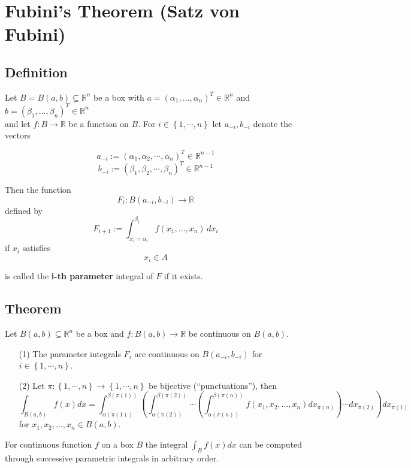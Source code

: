 \documentclass{article}
\begin{document}
\section{Fubini's Theorem (Satz von Fubini)}
\subsection*{Definition}
Let \( B = B(a,b) \subseteq \mathbb{R}^n \) be a box with \( a = (\alpha_1, \ldots,
\alpha_n)^T \in \mathbb{R}^n \) and \( b = (\beta_1, \ldots, \beta_n)^T \in \mathbb{R}^n \)
\\ and let \( f : B \to \mathbb{R} \) be a function on \( B \). For $i \in \left\{1,\cdots,n\right\}$
let \( a_{-i}, b_{-i} \) denote the vectors

\[ a_{-i} := (\alpha_1,\alpha_{2}, \cdots , \alpha_n)^T \in \mathbb{R}^{n-1} \] 
\[ b_{-i} := (\beta_1, \beta_2, \cdots , \beta_n)^T \in
\mathbb{R}^{n-1} \]

Then the function \[ F_i : B(a_{-i}, b_{-i}) \to \mathbb{R} \] defined by \[
F_{i+1} := \int_{x_i = \alpha_i}^{\beta_i} f(x_1, \dots, x_n) \, dx_i \] if \( x_i \) satisfies \[ x_i \in A
\]

is called the \textbf{i-th parameter} integral of \( F \) if it exists.
\subsection*{Theorem}
Let \( B(a,b) \subseteq \mathbb{R}^n \) be a box and \( f : B(a,b) \rightarrow \mathbb{R} \) be continuous on \( B(a,b) \).

\begin{enumerate}
    \item[(1)] The parameter integrals \( F_i \) are continuous on \( B(a_{-i}, b_{-i}) \) for \( i \in \left\{1, \cdots,n \right\} \).

    \item[(2)] Let \(\pi : \left\{1, \cdots,n\right\} \rightarrow \left\{1, \cdots, n\right\}\) be bijective (``punctuations''), then
    \[
    \int_{B(a,b)} f(x) dx = \int_{\alpha(\pi(1))}^{\beta(\pi(1))} \left( \int_{\alpha(\pi(2))}^{\beta(\pi(2))} \cdots \left( \int_{\alpha(\pi(n))}^{\beta(\pi(n))} f(x_1, x_2, \ldots, x_n) dx_{\pi(n)} \right) \cdots dx_{\pi(2)} \right) dx_{\pi(1)}
    \]
    for \( x_1, x_2, \ldots, x_n \in B(a,b) \).
\end{enumerate}

For continuous function \( f \) on a box \( B \) the integral \(\int_{B} f(x) dx\) can be computed through successive parametric integrals in arbitrary order.
\vspace{5mm}
\end{document}
